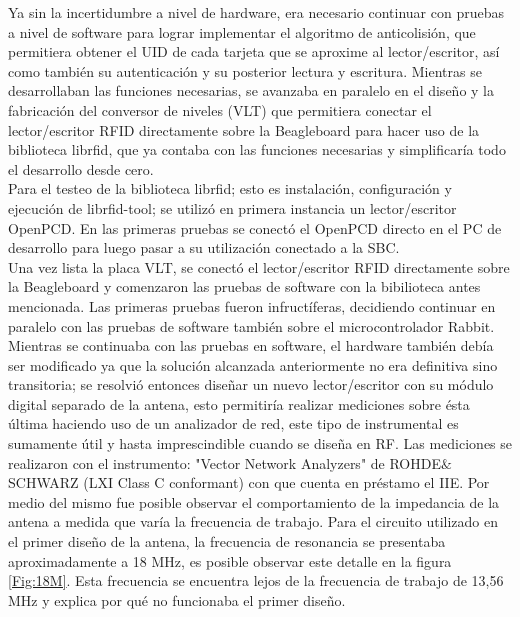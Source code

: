 Ya sin la incertidumbre a nivel de hardware, era necesario continuar con pruebas a nivel de software para lograr implementar el algoritmo de anticolisión, que permitiera obtener el UID de cada tarjeta que se aproxime al lector/escritor, así como también su autenticación y su posterior lectura y escritura. Mientras se desarrollaban las funciones necesarias, se avanzaba en paralelo en el diseño y la fabricación del conversor de niveles (VLT) que permitiera conectar el lector/escritor RFID directamente sobre la Beagleboard para hacer uso de la biblioteca librfid, que ya contaba con las funciones necesarias y simplificaría todo el desarrollo desde cero.\\
Para el testeo de la biblioteca librfid; esto es instalación, configuración y ejecución de librfid-tool; se utilizó en primera instancia un lector/escritor OpenPCD.
En las primeras pruebas se conectó el OpenPCD directo en el PC de desarrollo para luego pasar a su utilización conectado a la SBC.\\
Una vez lista la placa VLT, se conectó el lector/escritor RFID directamente sobre la Beagleboard y comenzaron las pruebas de software con la bibilioteca antes mencionada. Las primeras pruebas fueron infructíferas, decidiendo continuar en paralelo con las pruebas de software también sobre el microcontrolador Rabbit. 
Mientras se continuaba con las pruebas en software, el hardware también debía ser modificado ya que la solución alcanzada anteriormente no era definitiva sino transitoria; se resolvió entonces diseñar un nuevo lector/escritor con su módulo digital separado de la antena, esto permitiría realizar mediciones sobre ésta última haciendo uso de un analizador de red, este tipo de instrumental es sumamente útil y hasta imprescindible cuando se diseña en RF.
Las mediciones se realizaron con el instrumento: "Vector Network Analyzers" de 
ROHDE$\&$SCHWARZ (LXI Class C conformant) con que cuenta en préstamo el IIE. Por medio del mismo fue posible observar el comportamiento de la impedancia de la antena a medida que varía la frecuencia de trabajo.
Para el circuito utilizado en el primer diseño de la antena, la frecuencia de resonancia se presentaba aproximadamente a 18 MHz, es posible observar este detalle en la figura \ref{Fig:18M}. Esta frecuencia se encuentra lejos de la frecuencia de trabajo de 13,56 MHz y explica por qué no funcionaba el primer diseño.

